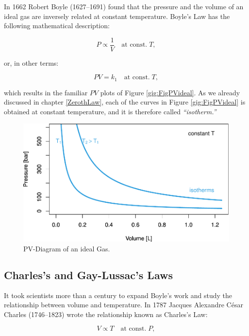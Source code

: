 \documentclass[
  9pt,
]{extbook}
\theoremstyle{definition}
\theoremstyle{definition}
\theoremstyle{definition}
\theoremstyle{remark}
\begin{document}
In 1662 Robert Boyle (1627--1691) found that the pressure and the volume of an ideal gas are inversely related at constant temperature. Boyle's Law has the following mathematical description:

\begin{equation}
P\propto\frac{1}{V}\quad\text{at const.}\;T,
\label{eq:boylelaw1}
\end{equation}

or, in other terms:

\begin{equation}
PV=k_1\quad\text{at const.}\;T,
\label{eq:boylelaw2}
\end{equation}

which results in the familiar \(PV\) plots of Figure \ref{gig:FigPVideal}. As we already discussed in chapter \ref{ZerothLaw}, each of the curves in Figure \ref{gig:FigPVideal} is obtained at constant temperature, and it is therefore called \emph{``isotherm.''}

\begin{figure}

{\centering \includegraphics[width=0.7\linewidth]{pchem1_files/figure-latex/FigPVideal-1} 

}

\caption{PV-Diagram of an ideal Gas.}\label{fig:FigPVideal}
\end{figure}

\hypertarget{charless-and-gay-lussacs-laws}{%
\subsection{Charles's and Gay-Lussac's Laws}\label{charless-and-gay-lussacs-laws}}

It took scientists more than a century to expand Boyle's work and study the relationship between volume and temperature. In 1787 Jacques Alexandre César Charles (1746--1823) wrote the relationship known as Charles's Law:

\begin{equation}
V\propto T\quad\text{at const.}\;P,
\label{eq:charleslaw1}
\end{equation}
\end{document}
